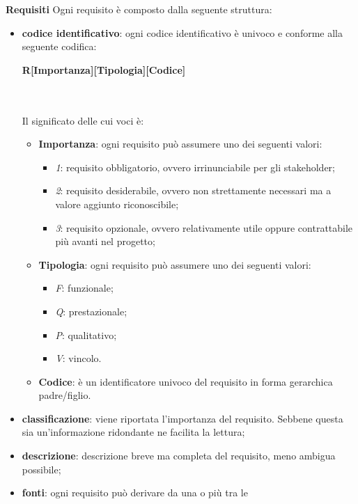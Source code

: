 \noindent
\textbf{Requisiti} \newline \newline
Ogni requisito è composto dalla seguente struttura:
	\begin{itemize}
		\item \textbf{codice identificativo}: ogni codice identificativo è univoco e 
			conforme alla seguente codifica: \\
			\centerline{\textbf{R[Importanza][Tipologia][Codice]}} \\ \\
			Il significato delle cui voci è:
			\begin{itemize}
				\item \textbf{Importanza}: ogni requisito può assumere uno dei seguenti 
					valori:
					\begin{itemize}
						\item \textit{1}: requisito obbligatorio, ovvero irrinunciabile per gli 
							stakeholder;
						\item \textit{2}: requisito desiderabile, ovvero non strettamente 
							necessari ma a valore aggiunto riconoscibile;
						\item \textit{3}: requisito opzionale, ovvero relativamente utile oppure 
							contrattabile più avanti nel progetto;	
					\end{itemize}
				\item \textbf{Tipologia}: ogni requisito può assumere uno dei seguenti 
					valori:
					\begin{itemize}
						\item \textit{F}: funzionale;
						\item \textit{Q}: prestazionale;
						\item \textit{P}: qualitativo;
						\item \textit{V}: vincolo.
					\end{itemize}
				\item \textbf{Codice}: è un identificatore univoco del requisito in forma 
					gerarchica padre/figlio.
			\end{itemize}
		\item \textbf{classificazione}: viene riportata l'importanza del requisito. 
			Sebbene questa sia un'informazione ridondante ne facilita la lettura;
		\item \textbf{descrizione}: descrizione breve ma completa del requisito, 
			meno ambigua possibile;
		\item \textbf{fonti}: ogni requisito può derivare da una o più tra le 

\end{itemize}
